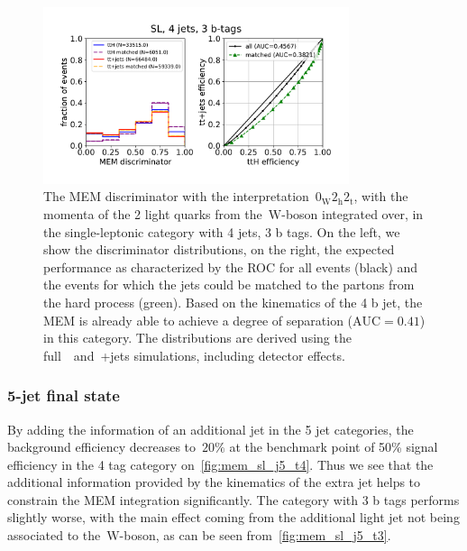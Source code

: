 \begin{figure}[ht]
\begin{centering}
\includegraphics[width = 0.8\textwidth]{figures/mem/mem_sl_j4_t3.pdf}
\caption[MEM with the~$0_{\mathrm{W}} 2_{\mathrm{h}} 2_{\mathrm{t}}$ interpretation in the 4~jet, 3~b~tag category]{The MEM discriminator with the interpretation~$0_{\mathrm{W}} 2_{\mathrm{h}} 2_{\mathrm{t}}$, with the momenta of the 2 light quarks from the~$\mathrm{W}$-boson integrated over, in the single-leptonic category with 4 jets, 3 b tags. On the left, we show the discriminator distributions, on the right, the expected performance as characterized by the ROC for all events (black) and the events for which the jets could be matched to the partons from the hard process (green). Based on the kinematics of the 4 b jet, the MEM is already able to achieve a degree of separation ($\mathrm{AUC} = 0.41$) in this category. The distributions are derived using the full~\ttHbb~and~\ttbar+jets simulations, including detector effects.}
\label{fig:mem_sl_j4_t3}
\end{centering}
\end{figure}

\subsubsection{5-jet final state}
By adding the information of an additional jet in the 5 jet categories, the background efficiency decreases to~$20\%$ at the benchmark point of 50\% signal efficiency in the 4 tag category on~\cref{fig:mem_sl_j5_t4}. Thus we see that the additional information provided by the kinematics of the extra jet helps to constrain the MEM integration significantly. The category with 3 b tags performs slightly worse, with the main effect coming from the additional light jet not being associated to the~$\mathrm{W}$-boson, as can be seen from~\cref{fig:mem_sl_j5_t3}.

